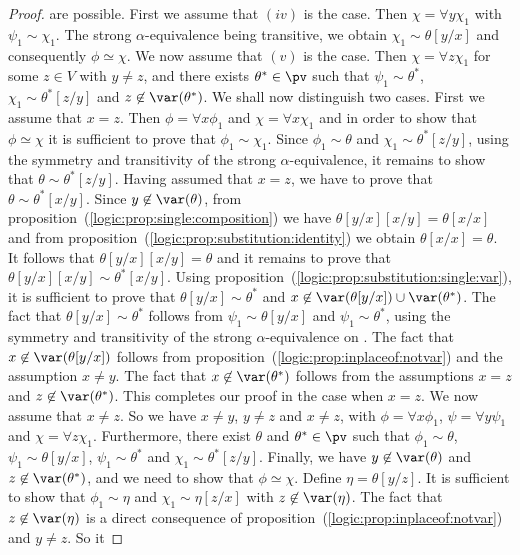 \begin{proof}
are possible. First we assume that $(iv)$ is the case. Then
$\chi=\forall y\chi_{1}$ with $\psi_{1}\sim\chi_{1}$. The strong
$\alpha$-equivalence being transitive, we obtain
$\chi_{1}\sim\theta[y/x]$ and consequently $\phi\simeq\chi$. We now
assume that $(v)$ is the case. Then $\chi=\forall z\chi_{1}$ for
some $z\in V$ with $y\neq z$, and there exists $\theta^{*}\in\pv$
such that $\psi_{1}\sim\theta^{*}$, $\chi_{1}\sim\theta^{*}[z/y]$
and $z\not\in\var(\theta^{*})$. We shall now distinguish two cases.
First we assume that $x=z$. Then $\phi=\forall x\phi_{1}$ and
$\chi=\forall x\chi_{1}$ and in order to show that $\phi\simeq\chi$
it is sufficient to prove that $\phi_{1}\sim\chi_{1}$. Since
$\phi_{1}\sim\theta$ and $\chi_{1}\sim\theta^{*}[z/y]$, using the
symmetry and transitivity of the strong $\alpha$-equivalence, it
remains to show that $\theta\sim\theta^{*}[z/y]$. Having assumed
that $x=z$, we have to prove that $\theta\sim\theta^{*}[x/y]$. Since
$y\not\in\var(\theta)$, from
proposition~(\ref{logic:prop:single:composition}) we have
$\theta[y/x][x/y]=\theta[x/x]$ and from
proposition~(\ref{logic:prop:substitution:identity}) we obtain
$\theta[x/x]=\theta$. It follows that $\theta[y/x][x/y]=\theta$ and
it remains to prove that $\theta[y/x][x/y]\sim\theta^{*}[x/y]$.
Using proposition~(\ref{logic:prop:substitution:single:var}), it is
sufficient to prove that $\theta[y/x]\sim\theta^{*}$ and
$x\not\in\var(\theta[y/x])\cup\var(\theta^{*})$. The fact that
$\theta[y/x]\sim\theta^{*}$ follows from $\psi_{1}\sim\theta[y/x]$
and $\psi_{1}\sim\theta^{*}$, using the symmetry and transitivity of
the strong $\alpha$-equivalence on \pv. The fact that
$x\not\in\var(\theta[y/x])$ follows from
proposition~(\ref{logic:prop:inplaceof:notvar}) and the assumption
$x\neq y$. The fact that $x\not\in\var(\theta^{*})$ follows from the
assumptions $x=z$ and $z\not\in\var(\theta^{*})$. This completes our
proof in the case when $x=z$. We now assume that $x\neq z$. So we
have $x\neq y$, $y\neq z$ and $x\neq z$, with $\phi=\forall
x\phi_{1}$, $\psi=\forall y\psi_{1}$ and $\chi=\forall z\chi_{1}$.
Furthermore, there exist $\theta$ and $\theta^{*}\in\pv$ such that
$\phi_{1}\sim\theta$, $\psi_{1}\sim\theta[y/x]$,
$\psi_{1}\sim\theta^{*}$ and $\chi_{1}\sim\theta^{*}[z/y]$. Finally,
we have $y\not\in\var(\theta)$ and $z\not\in\var(\theta^{*})$, and
we need to show that $\phi\simeq\chi$. Define $\eta=\theta[y/z]$. It
is sufficient to show that $\phi_{1}\sim\eta$ and
$\chi_{1}\sim\eta[z/x]$ with $z\not\in\var(\eta)$. The fact that
$z\not\in\var(\eta)$ is a direct consequence of
proposition~(\ref{logic:prop:inplaceof:notvar}) and $y\neq z$. So it

\end{proof}
